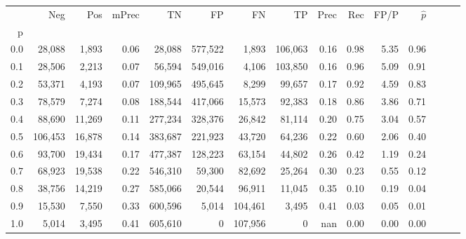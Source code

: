 \begin{tabular}{rrrrrrrrrrrrrrr}
\toprule
{} &      Neg &     Pos & mPrec &       TN &       FP &       FN &       TP &  Prec &   Rec &  FP/P & $\hat{p}$ \\
p   &          &         &       &          &          &          &          &       &       &       &           \\
\midrule
0.0 &   28,088 &   1,893 &  0.06 &   28,088 &  577,522 &    1,893 &  106,063 &  0.16 &  0.98 &  5.35 &      0.96 \\
0.1 &   28,506 &   2,213 &  0.07 &   56,594 &  549,016 &    4,106 &  103,850 &  0.16 &  0.96 &  5.09 &      0.91 \\
0.2 &   53,371 &   4,193 &  0.07 &  109,965 &  495,645 &    8,299 &   99,657 &  0.17 &  0.92 &  4.59 &      0.83 \\
0.3 &   78,579 &   7,274 &  0.08 &  188,544 &  417,066 &   15,573 &   92,383 &  0.18 &  0.86 &  3.86 &      0.71 \\
0.4 &   88,690 &  11,269 &  0.11 &  277,234 &  328,376 &   26,842 &   81,114 &  0.20 &  0.75 &  3.04 &      0.57 \\
0.5 &  106,453 &  16,878 &  0.14 &  383,687 &  221,923 &   43,720 &   64,236 &  0.22 &  0.60 &  2.06 &      0.40 \\
0.6 &   93,700 &  19,434 &  0.17 &  477,387 &  128,223 &   63,154 &   44,802 &  0.26 &  0.42 &  1.19 &      0.24 \\
0.7 &   68,923 &  19,538 &  0.22 &  546,310 &   59,300 &   82,692 &   25,264 &  0.30 &  0.23 &  0.55 &      0.12 \\
0.8 &   38,756 &  14,219 &  0.27 &  585,066 &   20,544 &   96,911 &   11,045 &  0.35 &  0.10 &  0.19 &      0.04 \\
0.9 &   15,530 &   7,550 &  0.33 &  600,596 &    5,014 &  104,461 &    3,495 &  0.41 &  0.03 &  0.05 &      0.01 \\
1.0 &    5,014 &   3,495 &  0.41 &  605,610 &        0 &  107,956 &        0 &   nan &  0.00 &  0.00 &      0.00 \\
\bottomrule
\end{tabular}

